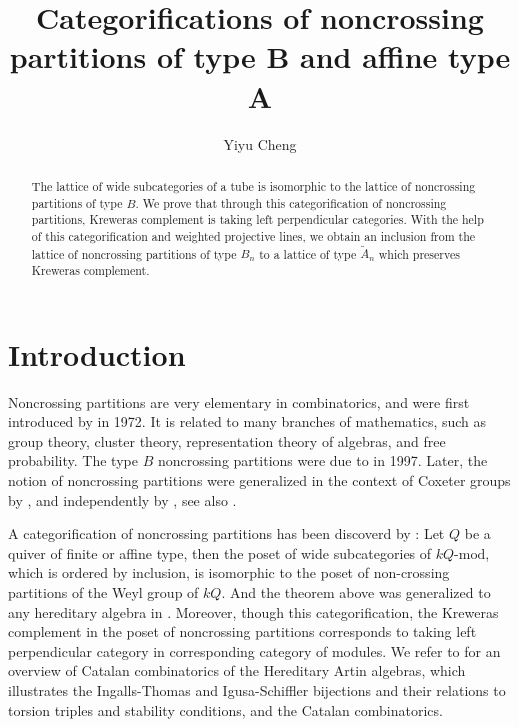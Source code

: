 \documentclass[a4paper, 11pt, reqno]{amsart}
\numberwithin{equation}{section}
\theoremstyle{remark}
\theoremstyle{definition}
\begin{document}
\title{Categorifications of noncrossing partitions of type B and affine type A}
\author{Yiyu Cheng}

\begin{abstract}
   The lattice of wide subcategories of a tube is isomorphic to the lattice of noncrossing partitions of type $B$. We prove that through this categorification of noncrossing partitions, Kreweras complement is taking left perpendicular categories. 
   With the help of this categorification and weighted projective lines, we obtain an inclusion from the lattice of noncrossing partitions of type $B_n$ to a lattice of type $\tilde A_n$ which preserves Kreweras complement.
\end{abstract}

\maketitle

\section{Introduction}

Noncrossing partitions are very elementary in combinatorics, and were first introduced by \cite{kreweras1972partitions} in 1972. It is related to many branches of mathematics, such as group theory, cluster theory, representation theory of algebras, and free probability. The type $B$ noncrossing partitions were due to \cite{reiner1997non} in 1997. Later, the notion of noncrossing partitions were generalized in the context of Coxeter groups by \cite{brady2001partial,brady2002k}, and independently by \cite{bessis2003dual}, see also \cite{armstrong2009generalized}.

A categorification of noncrossing partitions has been discoverd by \cite[Theorem~3.13, Theorem~3.16]{ingalls2009noncrossing}: Let $Q$ be a quiver of finite or affine type, then the poset of wide subcategories of $kQ \text{-} \mathrm{mod}$, which is ordered by inclusion, is isomorphic to the poset of non-crossing partitions of the Weyl group of $kQ$. And the theorem above was generalized to any hereditary algebra in \cite[Theorem~1.2]{hubery2016categorification}. Moreover, though this categorification, the Kreweras complement in the poset of noncrossing partitions corresponds to taking left perpendicular category in corresponding category of modules. We refer to \cite{ringel2016catalan} for an overview of Catalan combinatorics of the Hereditary Artin algebras, which illustrates the Ingalls-Thomas and Igusa-Schiffler bijections and their relations to torsion triples and stability conditions, and the Catalan combinatorics.
\end{document}
